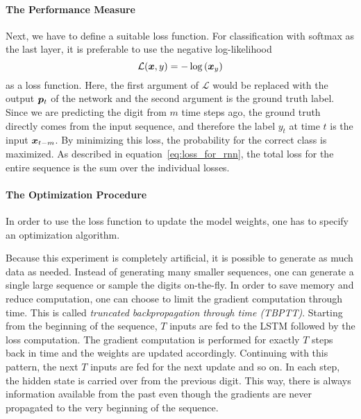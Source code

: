 		\paragraph{The Performance Measure}
		Next, we have to define a suitable loss function. 
		For classification with softmax as the last layer, it is preferable to use the negative log-likelihood
		\begin{equation}
			\mathcal{L}(\bm{x}, y) = -\log\left(\bm{x}_y\right)
		\end{equation}
		as a loss function. 
		Here, the first argument of $\mathcal{L}$ would be replaced with the output $\bm{p}_t$ of the network and the second argument is the ground truth label. 
		Since we are predicting the digit from $m$ time steps ago, the ground truth directly comes from the input sequence, and therefore the label $y_t$ at time $t$ is the input $\bm{x}_{t - m}$.
		By minimizing this loss, the probability for the correct class is maximized.
		As described in equation~\ref{eq:loss_for_rnn}, the total loss for the entire sequence is the sum over the individual losses.
		
		\paragraph{The Optimization Procedure}
		In order to use the loss function to update the model weights, one has to specify an optimization algorithm.

		
		Because this experiment is completely artificial, it is possible to generate as much data as needed.
		Instead of generating many smaller sequences, one can generate a single large sequence or sample the digits on-the-fly.
		In order to save memory and reduce computation, one can choose to limit the gradient computation through time.
		This is called \emph{truncated backpropagation through time (TBPTT)}. 
		Starting from the beginning of the sequence, $T$ inputs are fed to the LSTM followed by the loss computation.
		The gradient computation is performed for exactly $T$ steps back in time and the weights are updated accordingly. 
		Continuing with this pattern, the next $T$ inputs are fed for the next update and so on.
		In each step, the hidden state is carried over from the previous digit.
		This way, there is always information available from the past even though the gradients are never propagated to the very beginning of the sequence.
		
